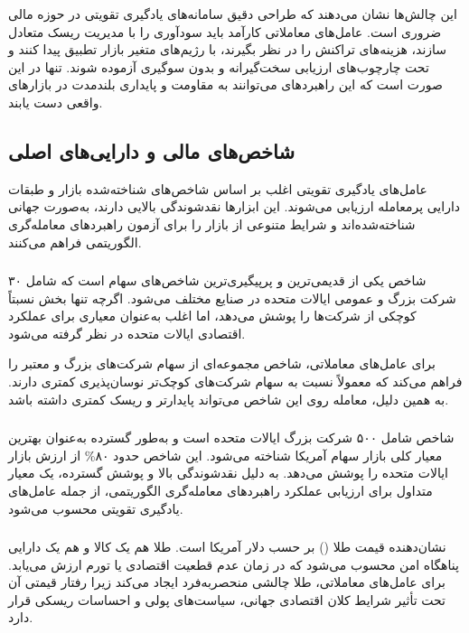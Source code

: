 \documentclass[12pt, a4paper]{report}
\begin{document}
\bigskip
این چالش‌ها نشان می‌دهند که طراحی دقیق سامانه‌های یادگیری تقویتی در حوزه مالی ضروری است. عامل‌های معاملاتی کارآمد باید سودآوری را با مدیریت ریسک متعادل سازند، هزینه‌های تراکنش را در نظر بگیرند، با رژیم‌های متغیر بازار تطبیق پیدا کنند و تحت چارچوب‌های ارزیابی سخت‌گیرانه و بدون سوگیری آزموده شوند. تنها در این صورت است که این راهبردهای می‌توانند به مقاومت و پایداری بلندمدت در بازارهای واقعی دست یابند.  


\subsection{شاخص‌های مالی\protect{} و دارایی‌های اصلی\protect{}}

عامل‌های یادگیری تقویتی اغلب بر اساس شاخص‌های شناخته‌شده بازار و طبقات دارایی پرمعامله ارزیابی می‌شوند. این ابزارها نقدشوندگی بالایی دارند، به‌صورت جهانی شناخته‌شده‌اند و شرایط متنوعی از بازار را برای آزمون راهبردهای معامله‌گری الگوریتمی فراهم می‌کنند.  

\subsubsection{}
شاخص  یکی از قدیمی‌ترین و پرپیگیری‌ترین شاخص‌های سهام است که شامل ۳۰ شرکت بزرگ و عمومی ایالات متحده در صنایع مختلف می‌شود. اگرچه تنها بخش نسبتاً کوچکی از شرکت‌ها را پوشش می‌دهد، اما اغلب به‌عنوان معیاری برای عملکرد اقتصادی ایالات متحده در نظر گرفته می‌شود.  

برای عامل‌های معاملاتی، شاخص  مجموعه‌ای از سهام شرکت‌های بزرگ و معتبر را فراهم می‌کند که معمولاً نسبت به سهام شرکت‌های کوچک‌تر نوسان‌پذیری کمتری دارند. به همین دلیل، معامله روی این شاخص می‌تواند پایدارتر و ریسک کمتری داشته باشد.

\subsubsection{}
شاخص  شامل ۵۰۰ شرکت بزرگ ایالات متحده است و به‌طور گسترده به‌عنوان بهترین معیار کلی بازار سهام آمریکا شناخته می‌شود. این شاخص حدود ۸۰\% از ارزش بازار ایالات متحده را پوشش می‌دهد.  
به دلیل نقدشوندگی بالا و پوشش گسترده، یک معیار متداول برای ارزیابی عملکرد راهبردهای معامله‌گری الگوریتمی، از جمله عامل‌های یادگیری تقویتی محسوب می‌شود.  

\subsubsection{}
 نشان‌دهنده قیمت طلا () بر حسب دلار آمریکا است. طلا هم یک کالا و هم یک دارایی پناهگاه امن محسوب می‌شود که در زمان عدم قطعیت اقتصادی یا تورم ارزش می‌یابد.  
برای عامل‌های معاملاتی، طلا چالشی منحصربه‌فرد ایجاد می‌کند زیرا رفتار قیمتی آن تحت تأثیر شرایط کلان اقتصادی جهانی، سیاست‌های پولی و احساسات ریسکی قرار دارد.
\end{document}
